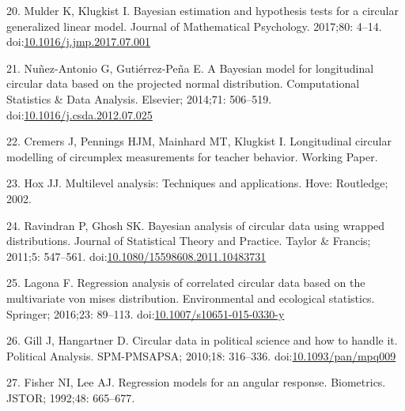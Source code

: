 \documentclass[11pt,]{article}
\begin{document}
\leavevmode\hypertarget{ref-mulder2017bayesian}{}%
20. Mulder K, Klugkist I. Bayesian estimation and hypothesis tests for a
circular generalized linear model. Journal of Mathematical Psychology.
2017;80: 4--14.
doi:\href{https://doi.org/10.1016/j.jmp.2017.07.001}{10.1016/j.jmp.2017.07.001}

\leavevmode\hypertarget{ref-nunez2014bayesian}{}%
21. Nuñez-Antonio G, Gutiérrez-Peña E. A Bayesian model for longitudinal
circular data based on the projected normal distribution. Computational
Statistics \& Data Analysis. Elsevier; 2014;71: 506--519.
doi:\href{https://doi.org/10.1016/j.csda.2012.07.025}{10.1016/j.csda.2012.07.025}

\leavevmode\hypertarget{ref-longitudinalpaper}{}%
22. Cremers J, Pennings HJM, Mainhard MT, Klugkist I. Longitudinal
circular modelling of circumplex measurements for teacher behavior.
Working Paper.

\leavevmode\hypertarget{ref-hox2002multilevel}{}%
23. Hox JJ. Multilevel analysis: Techniques and applications. Hove:
Routledge; 2002.

\leavevmode\hypertarget{ref-ravindran2011bayesian}{}%
24. Ravindran P, Ghosh SK. Bayesian analysis of circular data using
wrapped distributions. Journal of Statistical Theory and Practice.
Taylor \& Francis; 2011;5: 547--561.
doi:\href{https://doi.org/10.1080/15598608.2011.10483731}{10.1080/15598608.2011.10483731}

\leavevmode\hypertarget{ref-lagona2016regression}{}%
25. Lagona F. Regression analysis of correlated circular data based on
the multivariate von mises distribution. Environmental and ecological
statistics. Springer; 2016;23: 89--113.
doi:\href{https://doi.org/10.1007/s10651-015-0330-y}{10.1007/s10651-015-0330-y}

\leavevmode\hypertarget{ref-gill2010}{}%
26. Gill J, Hangartner D. Circular data in political science and how to
handle it. Political Analysis. SPM-PMSAPSA; 2010;18: 316--336.
doi:\href{https://doi.org/10.1093/pan/mpq009}{10.1093/pan/mpq009}

\leavevmode\hypertarget{ref-fisher1992regression}{}%
27. Fisher NI, Lee AJ. Regression models for an angular response.
Biometrics. JSTOR; 1992;48: 665--677.
\end{document}
